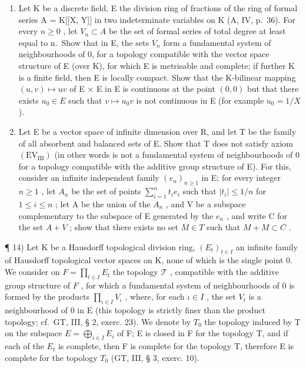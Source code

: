 \begin{enumerate}
\def\labelenumi{\arabic{enumi})}
\setcounter{enumi}{11}
\item
  Let K be a discrete field, E the division ring of fractions of the ring of formal series A = K{[}{[}X, Y{]}{]} in two indeterminate variables on K (A, IV, p.~36). For every \(n \geqslant 0\) , let \(V_{n} \subset A\) be the set of formal series of total degree at least equal to n.~Show that in E, the sets \(V_{n}\) form a fundamental system of neighbourhoods of 0, for a topology compatible with the vector space structure of E (over K), for which E is metrisable and complete; if further K is a finite field, then E is locally compact. Show that the K-bilinear mapping \((u, v) \mapsto uv\) of E × E in E is continuous at the point \((0, 0)\) but that there exists \(u_{0} \in E\) such that \(v \mapsto u_{0}v\) is not continuous in E (for example \(u_{0} = 1/X\) ).
\item
  Let E be a vector space of infinite dimension over R, and let T be the family of all absorbent and balanced sets of E. Show that T does not satisfy axiom \((\mathrm{EV}_{\mathrm{III}})\) (in other words is not a fundamental system of neighbourhoods of 0 for a topology compatible with the additive group structure of E). For this, consider an infinite independent family \((e_{n})_{n\geqslant1}\) in E; for every integer \(n\geqslant1\) , let \(A_{n}\) be the set of points \(\sum_{i=1}^{n}t_{i}e_{i}\) such that \(|t_{i}|\leqslant1/n\) for \(1\leqslant i\leqslant n\) ; let A be the union of the \(A_{n}\) , and V be a subspace complementary to the subspace of E generated by the \(e_{n}\) , and write C for the set \(A+V\) ; show that there exists no set \(M\in T\) such that \(M+M\subset C\) .
\end{enumerate}

¶ 14) Let K be a Hausdorff topological division ring, \((E_{t})_{t\in I}\) an infinite family of Hausdorff topological vector spaces on K, none of which is the single point 0. We consider on \(F = \prod_{t\in I} E_t\) the topology \(\mathcal{T}\) , compatible with the additive group structure of \(F\) , for which a fundamental system of neighbourhoods of 0 is formed by the products \(\prod_{\iota \in I} V_{\iota}\) , where, for each \(\iota \in I\) , the set \(V_{t}\) is a neighbourhood of 0 in E (this topology is strictly finer than the product topology; cf.~GT, III, § 2, exerc. 23). We denote by \(T_{0}\) the topology induced by T on the subspace \(E = \bigoplus_{i \in I} E_{i}\) of F; E is closed in F for the topology T, and if each of the \(E_{t}\) is complete, then F is complete for the topology T, therefore E is complete for the topology \(T_{0}\) (GT, III, § 3, exerc. 10).

